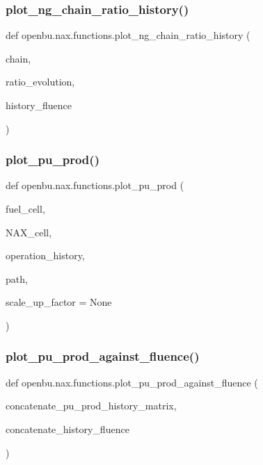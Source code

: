 \subsubsection{\texorpdfstring{plot\+\_\+ng\+\_\+chain\+\_\+ratio\+\_\+history()}{plot\_ng\_chain\_ratio\_history()}}
{\footnotesize\ttfamily def openbu.\+nax.\+functions.\+plot\+\_\+ng\+\_\+chain\+\_\+ratio\+\_\+history (\begin{DoxyParamCaption}\item[{}]{chain,  }\item[{}]{ratio\+\_\+evolution,  }\item[{}]{history\+\_\+fluence }\end{DoxyParamCaption})}

\mbox{\label{namespaceopenbu_1_1nax_1_1functions_aaad4c8a1ad74f15eeec4502d04ea52e6}} 
\subsubsection{\texorpdfstring{plot\+\_\+pu\+\_\+prod()}{plot\_pu\_prod()}}
{\footnotesize\ttfamily def openbu.\+nax.\+functions.\+plot\+\_\+pu\+\_\+prod (\begin{DoxyParamCaption}\item[{}]{fuel\+\_\+cell,  }\item[{}]{N\+A\+X\+\_\+cell,  }\item[{}]{operation\+\_\+history,  }\item[{}]{path,  }\item[{}]{scale\+\_\+up\+\_\+factor = {\ttfamily None} }\end{DoxyParamCaption})}

\mbox{\label{namespaceopenbu_1_1nax_1_1functions_a34286a0c073aba6dd147a640c3c50088}} 
\subsubsection{\texorpdfstring{plot\+\_\+pu\+\_\+prod\+\_\+against\+\_\+fluence()}{plot\_pu\_prod\_against\_fluence()}}
{\footnotesize\ttfamily def openbu.\+nax.\+functions.\+plot\+\_\+pu\+\_\+prod\+\_\+against\+\_\+fluence (\begin{DoxyParamCaption}\item[{}]{concatenate\+\_\+pu\+\_\+prod\+\_\+history\+\_\+matrix,  }\item[{}]{concatenate\+\_\+history\+\_\+fluence }\end{DoxyParamCaption})}

